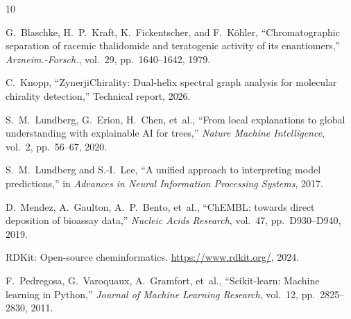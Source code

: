 \documentclass[11pt,a4paper]{article}
\begin{document}
\begin{thebibliography}{10}

G.~Blaschke, H.~P.~Kraft, K.~Fickentscher, and F.~K\"ohler,
``Chromatographic separation of racemic thalidomide and teratogenic activity
of its enantiomers,''
\textit{Arzneim.-Forsch.}, vol.~29, pp.~1640--1642, 1979.

C.~Knopp,
``ZynerjiChirality: Dual-helix spectral graph analysis for molecular
chirality detection,''
Technical report, 2026.

S.~M.~Lundberg, G.~Erion, H.~Chen, et~al.,
``From local explanations to global understanding with explainable AI
for trees,''
\textit{Nature Machine Intelligence}, vol.~2, pp.~56--67, 2020.

S.~M.~Lundberg and S.-I.~Lee,
``A unified approach to interpreting model predictions,''
in \textit{Advances in Neural Information Processing Systems}, 2017.

D.~Mendez, A.~Gaulton, A.~P.~Bento, et~al.,
``ChEMBL: towards direct deposition of bioassay data,''
\textit{Nucleic Acids Research}, vol.~47, pp.~D930--D940, 2019.

RDKit: Open-source cheminformatics.
\url{https://www.rdkit.org/}, 2024.

F.~Pedregosa, G.~Varoquaux, A.~Gramfort, et~al.,
``Scikit-learn: Machine learning in Python,''
\textit{Journal of Machine Learning Research}, vol.~12, pp.~2825--2830, 2011.

\end{thebibliography}
\end{document}
